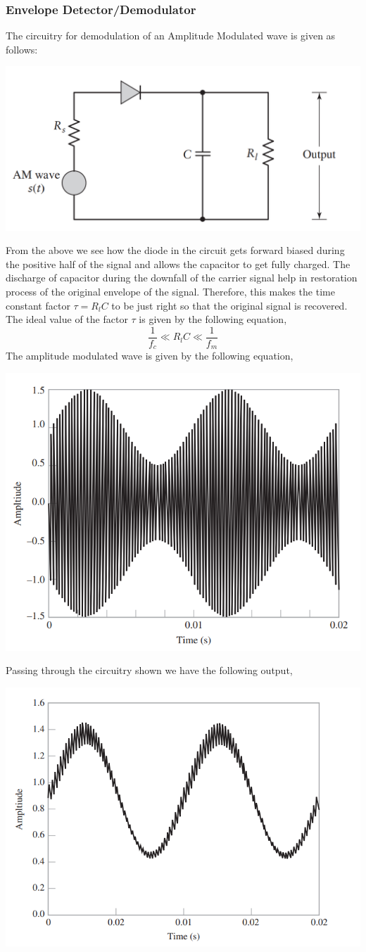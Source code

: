 \documentclass[12pt,a4paper]{article}%
\begin{document}
\begin{flushleft}
\begin{flushleft}
			\subsubsection{Envelope Detector/Demodulator}
			\begin{flushleft}
				The circuitry for demodulation of an Amplitude Modulated wave is given as follows:
				\begin{center}
					\includegraphics[width=0.60 \textwidth]{./images/Envelope Detector.png}
				\end{center}
				From the above we see how the diode in the circuit gets forward biased during the positive half of the signal and allows the capacitor to get fully charged. The discharge of capacitor during the downfall of the carrier signal help in restoration process of the original envelope of the signal. Therefore, this makes the time constant factor $\tau = R_l C$ to be just right so that the original signal is recovered. The ideal value of the factor $ \tau $ is given by the following equation,
				\begin{equation}
				\dfrac{1}{f_c} \ll R_l C \ll \dfrac{1}{f_m}
				\end{equation}
				The amplitude modulated wave is given by the following equation,
				\begin{center}
					\includegraphics[width=0.60 \textwidth]{./images/ammod.png}
				\end{center}
				Passing through the circuitry shown we have the following output,
				\begin{center}
					\includegraphics[width=0.60 \textwidth]{./images/amdemod.png}

\end{center}
\end{flushleft}
\end{flushleft}
\end{flushleft}
\end{document}
